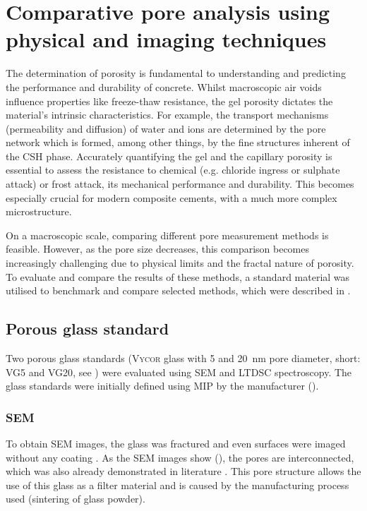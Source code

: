 \FloatBarrier
\newpage
\section{Comparative pore analysis using physical and imaging techniques}

The determination of porosity is fundamental to understanding and predicting the performance and durability of concrete.
Whilst macroscopic air voids influence properties like freeze-thaw resistance, the gel porosity dictates the material's intrinsic characteristics.
For example, the transport mechanisms (permeability and diffusion) of water and ions are determined by the pore network which is formed, among other things, by the fine structures inherent of the \ac{CSH} phase.
Accurately quantifying the gel and the capillary porosity is essential to assess the resistance to chemical (e.g. chloride ingress or sulphate attack) or frost attack, its mechanical performance and durability.
This becomes especially crucial for modern composite cements, with a much more complex microstructure.

On a macroscopic scale, comparing different pore measurement methods is feasible.
However, as the pore size decreases, this comparison becomes increasingly challenging due to physical limits and the fractal nature of porosity.
To evaluate and compare the results of these methods, a standard material was utilised to benchmark and compare selected methods, which were described in .

\subsection{Porous glass standard}

Two porous glass standards (\textsc{Vycor} glass with \num{5} and \qty{20}{\nano\meter} pore diameter, short: \acs{VG5} and \acs{VG20}, see ) were evaluated using \ac{SEM} and \ac{LTDSC} spectroscopy.
The glass standards were initially defined using \ac{MIP} by the manufacturer (). %

\subsubsection{\acs*{SEM}}

To obtain \ac{SEM} images, the glass was fractured and even surfaces were imaged without any coating \cite{kleiner.2026i}.
As the \ac{SEM} images show (), the pores are interconnected, which was also already demonstrated in literature \cite{levitz.1998, levitz.2007}.
This pore structure allows the use of this glass as a filter material and is caused by the manufacturing process used (sintering of glass powder).

